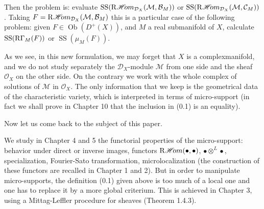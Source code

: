 \documentclass[11pt, letterpaper, draft, dvipdfmx]{book}
\theoremstyle{definition}
\newcommand{\mcal}{\mathcal}
\newcommand{\HOM}{\mathop{\mathscr{H}\hspace{-2pt}om}\nolimits}
\newcommand{\RHOM}{\mathop{\mathrm{R}\hspace{-1.5pt}\HOM}\nolimits}
\newcommand{\muS}{\mathop{\mathrm{SS}}\nolimits}
\newcommand{\RG}{\mathop{\mathrm{R}\hspace{-0pt}\Gamma}\nolimits}
\newcommand{\Ob}{\mathop{\mathrm{Ob}}\nolimits}
\theoremstyle{mystyle}
\numberwithin{equation}{section} %
\begin{document}
Then the problem is: 
evaluate $\muS(\RHOM_{\mcal{D}_X}(\mcal{M},\mcal{B}_M))$ or
$\muS(\RHOM_{\mcal{D}_X}(\mcal{M},\mcal{C}_M))$. 
Taking $F = \RHOM_{\mcal{D}_X}(\mcal{M},\mcal{B}_M)$ 
this is a particular case of the following problem: 
given $F \in \Ob(D^+(X))$, and $M$ a real submanifold of $X$, 
calculate $\muS (\RG_M(F))$ or $\muS(\mu_M(F))$.

As we see, in this new formulation, we may forget that $X$ is a
complexmanifold, and we do not study separately 
the $\mcal{D}_X$-module $\mcal{M}$ from one side 
and the sheaf $\mcal{O}_X$ on the other side. 
On the contrary 
we work with the whole complex of solutions of $\mcal{M}$ in $\mcal{O}_X$. 
The only information that we keep is 
the geometrical data of the characteristic variety, 
which is interpreted in terms of micro-support (in fact
we shall prove in Chapter 10 that the inclusion in (0.1) is an
equality). 

Now let us come back to the subject of this paper.

We study in Chapter 4 and 5 
the functorial properties of the micro-support: 
behavior under direct or inverse images, functors
$\RHOM(\bullet,\bullet)$, $\bullet\otimes^{L}\bullet$, 
specialization, Fourier-Sato transformation, 
microlocalization (the construction of 
these functors are recalled in Chapter 1 and 2). 
But in order to manipulate micro-supports, 
the definition (0.1) given above is too much 
of a local one and one has to replace it 
by a more global criterium. 
This is achieved in Chapter 3, 
using a Mittag-Leffler procedure for sheaves (Theorem 1.4.3).
\end{document}
